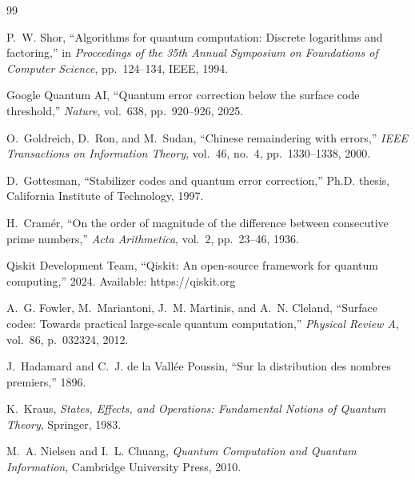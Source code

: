 \documentclass[12pt,a4paper]{article}
\begin{document}
\begin{thebibliography}{99}

P.~W. Shor, ``Algorithms for quantum computation: Discrete logarithms and factoring,'' in \emph{Proceedings of the 35th Annual Symposium on Foundations of Computer Science}, pp.~124--134, IEEE, 1994.

Google Quantum AI, ``Quantum error correction below the surface code threshold,'' \emph{Nature}, vol.~638, pp.~920--926, 2025.

O.~Goldreich, D.~Ron, and M.~Sudan, ``Chinese remaindering with errors,'' \emph{IEEE Transactions on Information Theory}, vol.~46, no.~4, pp.~1330--1338, 2000.

D.~Gottesman, ``Stabilizer codes and quantum error correction,'' Ph.D. thesis, California Institute of Technology, 1997.

H.~Cramér, ``On the order of magnitude of the difference between consecutive prime numbers,'' \emph{Acta Arithmetica}, vol.~2, pp.~23--46, 1936.

Qiskit Development Team, ``Qiskit: An open-source framework for quantum computing,'' 2024. Available: https://qiskit.org

A.~G. Fowler, M.~Mariantoni, J.~M. Martinis, and A.~N. Cleland, ``Surface codes: Towards practical large-scale quantum computation,'' \emph{Physical Review A}, vol.~86, p.~032324, 2012.

J.~Hadamard and C.~J. de la Vallée Poussin, ``Sur la distribution des nombres premiers,'' 1896.

K.~Kraus, \emph{States, Effects, and Operations: Fundamental Notions of Quantum Theory}, Springer, 1983.

M.~A. Nielsen and I.~L. Chuang, \emph{Quantum Computation and Quantum Information}, Cambridge University Press, 2010.

\end{thebibliography}
\end{document}
